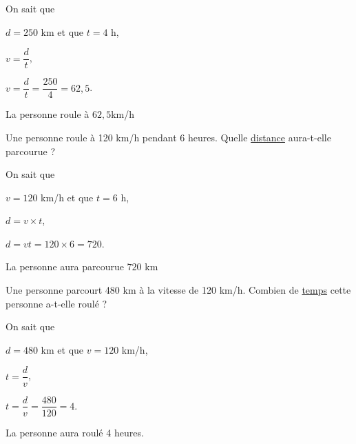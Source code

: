 \begin{labeling}{On sait que}
\item [On sait que] $ d = 250$ km et que $t=4$ h,
\item [or] $v=\dfrac{d}{t}$, 
\item [donc] $v=\dfrac{d}{t} = \dfrac{250}{4}=62,5$.
\end{labeling}

La personne roule à $62,5$km/h 

\bigskip


\medskip  

Une personne roule à 120 km/h pendant 6 heures. Quelle \underline{distance} aura-t-elle parcourue ?  

\begin{labeling}{On sait que}
\item [On sait que] $ v = 120$ km/h et que $t=6$ h,
\item [or] $d=v\times t$, 
\item [donc] $d=vt=120\times6=720$.
\end{labeling}

La personne aura parcourue $720$ km
   
\bigskip


\medskip 

Une personne parcourt 480 km à la vitesse de 120 km/h. Combien de \underline{temps} cette personne a-t-elle roulé  ?  

\begin{labeling}{On sait que}
\item [On sait que] $ d = 480$ km et que $v = 120$ km/h, 
\item [or] $t=\dfrac{d}{v}$, 
\item [donc] $t=\dfrac{d}{v} = \dfrac{480}{120} = 4$.
\end{labeling}

La personne aura roulé 4 heures.


\ifdefined\COMPLETE
\else
    
\fi